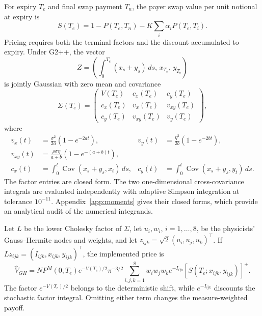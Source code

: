 \documentclass[11pt]{article}
\numberwithin{equation}{section}
\theoremstyle{definition}
\theoremstyle{remark}
\begin{document}
For expiry $T_e$ and final swap payment $T_n$, the payer swap value per unit
notional at expiry is
\begin{equation}
  S(T_e)=1-P(T_e,T_n)
  -K\sum_i \alpha_i P(T_e,T_i).
\end{equation}
Pricing requires both the terminal factors and the discount accumulated to
expiry. Under G2++, the vector
\begin{equation}
  Z=
  \left(
    \int_0^{T_e}(x_s+y_s)\,ds,\,
    x_{T_e},\,
    y_{T_e}
  \right)
\end{equation}
is jointly Gaussian with zero mean and covariance
\begin{equation}
  \Sigma(T_e)=
  \begin{pmatrix}
    V(T_e) & c_x(T_e) & c_y(T_e)\\
    c_x(T_e) & v_x(T_e) & v_{xy}(T_e)\\
    c_y(T_e) & v_{xy}(T_e) & v_y(T_e)
  \end{pmatrix},
  \label{eq:joint-covariance}
\end{equation}
where
\begin{align}
v_x(t)&=\frac{\sigma^2}{2a}(1-e^{-2at}),&
v_y(t)&=\frac{\eta^2}{2b}(1-e^{-2bt}),\\
v_{xy}(t)&=\frac{\rho\sigma\eta}{a+b}(1-e^{-(a+b)t}),\\
c_x(t)&=\int_0^t\operatorname{Cov}(x_s+y_s,x_t)\,ds,&
c_y(t)&=\int_0^t\operatorname{Cov}(x_s+y_s,y_t)\,ds.
\end{align}
The factor entries are closed form. The two one-dimensional cross-covariance
integrals are evaluated independently with adaptive Simpson integration at
tolerance $10^{-11}$. Appendix~\ref{app:moments} gives their closed forms, which
provide an analytical audit of the numerical integrands.

Let $L$ be the lower Cholesky factor of $\Sigma$, let
$u_i,w_i$, $i=1,\ldots,8$, be the physicists' Gauss--Hermite nodes and weights,
and let $z_{ijk}=\sqrt{2}(u_i,u_j,u_k)^\top$. If
$Lz_{ijk}=(I_{ijk},x_{ijk},y_{ijk})^\top$, the implemented price is
\begin{equation}
\widehat{V}_{GH}
=NP^{M}(0,T_e)e^{-V(T_e)/2}\pi^{-3/2}
\sum_{i,j,k=1}^{8}w_iw_jw_k e^{-I_{ijk}}
\left[S(T_e;x_{ijk},y_{ijk})\right]^+ .
\label{eq:gh-price}
\end{equation}
The factor $e^{-V(T_e)/2}$ belongs to the deterministic shift, while
$e^{-I_{ijk}}$ discounts the stochastic factor integral. Omitting either term
changes the measure-weighted payoff.
\end{document}
